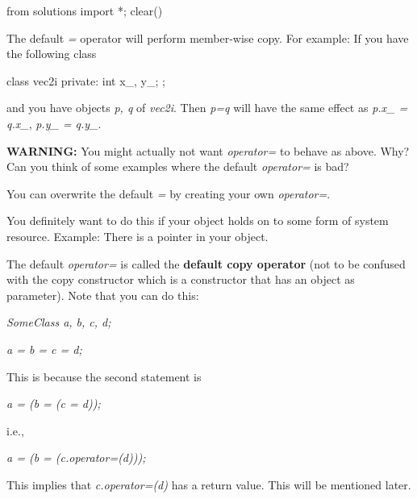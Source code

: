 \begin{python0}
from solutions import *; clear()
\end{python0}

The default \textit{=} operator will perform member-wise copy. For
example: If you have the following class

\begin{consolethree}[escapeinside=||]
class vec2i
{
private:
    int x_, y_;
};
\end{consolethree}

and you have objects \textit{p, q} of \textit{vec2i}. Then \textit{p=q} will
have the same effect as \textit{p.x\_ = q.x\_}, \textit{p.y\_ = q.y\_}.

\textbf{WARNING:} You might actually not want \textit{operator=} to behave
as above. Why? Can you think of some examples where the default
\textit{operator=} is bad?

You can overwrite the default \textit{=} by creating your own
\textit{operator=}.

You definitely want to do this if your object holds on to some form of
system resource. Example: There is a pointer in your object.

The default \textit{operator=} is called the \textbf{default copy
operator} (not to be confused with the copy constructor which is a
constructor that has an object as parameter). Note that you can do this:

\textit{SomeClass a, b, c, d;}

\textit{a = b = c = d;}

This is because the second statement is

\textit{a = (b = (c = d));}

i.e.,

\textit{a = (b = (c.operator=(d)));}

This implies that \textit{c.operator=(d)} has a return value. This will be
mentioned later.



